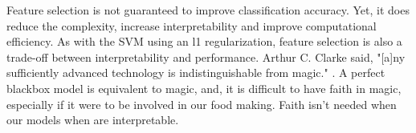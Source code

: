\documentclass[runningheads]{llncs}
\begin{document}
Feature selection is not guaranteed to improve classification accuracy.
Yet, it does reduce the complexity, increase interpretability and improve computational efficiency.
As with the SVM using an l1 regularization, feature selection is also a trade-off between interpretability and performance.
Arthur C. Clarke said, "[a]ny sufficiently advanced technology is indistinguishable from magic." \cite{clarke2013profiles}.
A perfect blackbox model is equivalent to magic, and, it is difficult to have faith in magic, especially if it were to be involved in our food making.
Faith isn't needed when our models when are interpretable.






\end{document}
